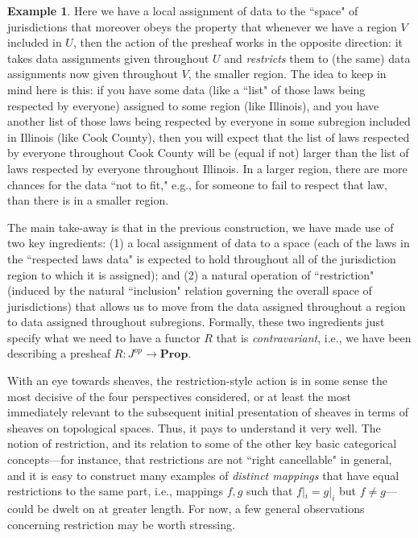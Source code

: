 \documentclass[a4paper]{book}
\theoremstyle{definition}
\newtheorem{example}{Example}[section]
\theoremstyle{definition}
\theoremstyle{definition}
\theoremstyle{theorem}
\theoremstyle{definition}
\begin{document}
\begin{example}
Here we have a local assignment of data to the ``space" of jurisdictions that moreover obeys the property that whenever we have a region $V$ included in $U$, then the action of the presheaf works in the opposite direction: it takes data assignments given throughout $U$ and \textit{restricts} them to (the same) data assignments now given throughout $V$, the smaller region. The idea to keep in mind here is this: if you have some data (like a ``list" of those laws being respected by everyone) assigned to some region (like Illinois), and you have another list of those laws being respected by everyone in some subregion included in Illinois (like Cook County), then you will expect that the list of laws respected by everyone throughout Cook County will be (equal if not) larger than the list of laws respected by everyone throughout Illinois. In a larger region, there are more chances for the data ``not to fit," e.g., for someone to fail to respect that law, than there is in a smaller region.\par   
The main take-away is that in the previous construction, we have made use of two key ingredients: (1) a local assignment of data to a space (each of the laws in the ``respected laws data" is expected to hold throughout all of the jurisdiction region to which it is assigned); and (2) a natural operation of ``restriction" (induced by the natural ``inclusion" relation governing the overall space of jurisdictions) that allows us to move from the data assigned throughout a region to data assigned throughout subregions. Formally, these two ingredients just specify what we need to have a functor $R$ that is \textit{contravariant}, i.e., we have been describing a presheaf $R: J^{op} \rightarrow \textbf{Prop}$.
	\end{example} 
With an eye towards sheaves, the restriction-style action is in some sense the most decisive of the four perspectives considered, or at least the most immediately relevant to the subsequent initial presentation of sheaves in terms of sheaves on topological spaces. Thus, it pays to understand it very well. The notion of restriction, and its relation to some of the other key basic categorical concepts---for instance, that restrictions are not ``right cancellable" in general, and it is easy to construct many examples of \textit{distinct mappings} that have equal restrictions to the same part, i.e., mappings $f, g$ such that $f|_i = g|_i$ but $f \neq g$---could be dwelt on at greater length. For now, a few general observations concerning restriction may be worth stressing.\par 
\end{document}
